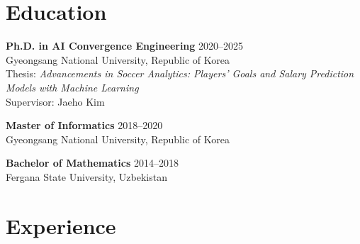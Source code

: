 \documentclass[11pt,a4paper]{article}
\begin{document}
\section*{Education}
\textbf{Ph.D. in AI Convergence Engineering} \hfill 2020--2025 \\
Gyeongsang National University, Republic of Korea \\
Thesis: \textit{Advancements in Soccer Analytics: Players' Goals and Salary Prediction Models with
Machine Learning} \\
Supervisor: Jaeho Kim

\medskip

\textbf{Master of Informatics} \hfill 2018--2020 \\
Gyeongsang National University, Republic of Korea

\medskip

\textbf{Bachelor of Mathematics} \hfill 2014--2018 \\
Fergana State University, Uzbekistan

\section*{Experience}
\end{document}
